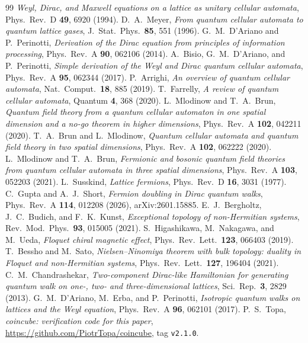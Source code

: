 \documentclass[aps,prd,twocolumn,superscriptaddress,nofootinbib,floatfix]{revtex4-2}
\begin{document}
\begin{thebibliography}{99}
\emph{Weyl, Dirac, and Maxwell equations on a lattice as unitary cellular
automata}, Phys.\ Rev.\ D \textbf{49}, 6920 (1994).
 D.~A.~Meyer,
\emph{From quantum cellular automata to quantum lattice gases},
J.\ Stat.\ Phys.\ \textbf{85}, 551 (1996).
 G.~M.~D'Ariano and P.~Perinotti,
\emph{Derivation of the Dirac equation from principles of information
processing}, Phys.\ Rev.\ A \textbf{90}, 062106 (2014).
 A.~Bisio, G.~M.~D'Ariano, and P.~Perinotti,
\emph{Simple derivation of the Weyl and Dirac quantum cellular automata},
Phys.\ Rev.\ A \textbf{95}, 062344 (2017).
 P.~Arrighi,
\emph{An overview of quantum cellular automata},
Nat.\ Comput.\ \textbf{18}, 885 (2019).
 T.~Farrelly,
\emph{A review of quantum cellular automata},
Quantum \textbf{4}, 368 (2020).
 L.~Mlodinow and T.~A.~Brun,
\emph{Quantum field theory from a quantum cellular automaton in one
spatial dimension and a no-go theorem in higher dimensions},
Phys.\ Rev.\ A \textbf{102}, 042211 (2020).
 T.~A.~Brun and L.~Mlodinow,
\emph{Quantum cellular automata and quantum field theory in two spatial
dimensions}, Phys.\ Rev.\ A \textbf{102}, 062222 (2020).
 L.~Mlodinow and T.~A.~Brun,
\emph{Fermionic and bosonic quantum field theories from quantum cellular
automata in three spatial dimensions},
Phys.\ Rev.\ A \textbf{103}, 052203 (2021).
 L.~Susskind,
\emph{Lattice fermions}, Phys.\ Rev.\ D \textbf{16}, 3031 (1977).
 C.~Gupta and A.~J.~Short,
\emph{Fermion doubling in Dirac quantum walks},
Phys.\ Rev.\ A \textbf{114}, 012208 (2026), arXiv:2601.15885.
 E.~J.~Bergholtz, J.~C.~Budich, and F.~K.~Kunst,
\emph{Exceptional topology of non-Hermitian systems},
Rev.\ Mod.\ Phys.\ \textbf{93}, 015005 (2021).
 S.~Higashikawa, M.~Nakagawa, and M.~Ueda,
\emph{Floquet chiral magnetic effect},
Phys.\ Rev.\ Lett.\ \textbf{123}, 066403 (2019).
 T.~Bessho and M.~Sato,
\emph{Nielsen--Ninomiya theorem with bulk topology: duality in Floquet
and non-Hermitian systems},
Phys.\ Rev.\ Lett.\ \textbf{127}, 196404 (2021).
 C.~M.~Chandrashekar,
\emph{Two-component Dirac-like Hamiltonian for generating quantum walk
on one-, two- and three-dimensional lattices},
Sci.\ Rep.\ \textbf{3}, 2829 (2013).
 G.~M.~D'Ariano, M.~Erba, and P.~Perinotti,
\emph{Isotropic quantum walks on lattices and the Weyl equation},
Phys.\ Rev.\ A \textbf{96}, 062101 (2017).
 P.~S.~Topa, \emph{coincube: verification code for this
paper}, \url{https://github.com/PiotrTopa/coincube}, tag \texttt{v2.1.0}.
\end{thebibliography}
\end{document}

